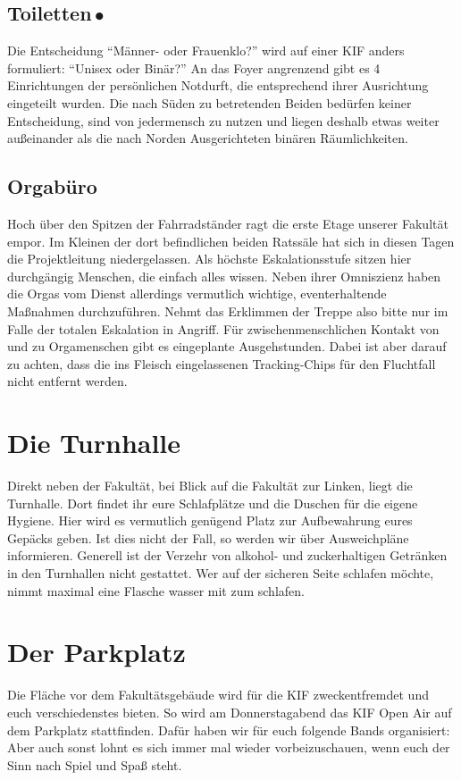 \subsection*{Toiletten{\,\color{StripeWC}$\bullet$\,}}
Die Entscheidung \enquote{Männer- oder Frauenklo?} wird auf einer KIF anders formuliert: \enquote{Unisex oder Binär?}
An das Foyer angrenzend gibt es 4 Einrichtungen der persönlichen Notdurft, die entsprechend ihrer Ausrichtung eingeteilt wurden.
Die nach Süden zu betretenden Beiden bedürfen keiner Entscheidung, sind von jedermensch zu nutzen und liegen deshalb etwas weiter außeinander als die nach Norden Ausgerichteten binären Räumlichkeiten.

\subsection*{Orgabüro}
Hoch über den Spitzen der Fahrradständer ragt die erste Etage unserer Fakultät empor.
Im Kleinen der dort befindlichen beiden Ratssäle hat sich in diesen Tagen die Projektleitung niedergelassen.
Als höchste Eskalationsstufe sitzen hier durchgängig Menschen, die einfach alles wissen.
Neben ihrer Omniszienz haben die Orgas vom Dienst allerdings vermutlich wichtige, eventerhaltende Maßnahmen durchzuführen.
Nehmt das Erklimmen der Treppe also bitte nur im Falle der totalen Eskalation in Angriff.
Für zwischenmenschlichen Kontakt von und zu Orgamenschen gibt es eingeplante Ausgehstunden.
Dabei ist aber darauf zu achten, dass die ins Fleisch eingelassenen Tracking-Chips für den Fluchtfall nicht entfernt werden.

\section*{Die Turnhalle}
Direkt neben der Fakultät, bei Blick auf die Fakultät zur Linken, liegt die Turnhalle.
Dort findet ihr eure Schlafplätze und die Duschen für die eigene Hygiene.
Hier wird es vermutlich genügend Platz zur Aufbewahrung eures Gepäcks geben.
Ist dies nicht der Fall, so werden wir über Ausweichpläne informieren.
Generell ist der Verzehr von alkohol- und zuckerhaltigen Getränken in den Turnhallen nicht gestattet.
Wer auf der sicheren Seite schlafen möchte, nimmt maximal eine Flasche wasser mit zum schlafen.

\section*{Der Parkplatz}
Die Fläche vor dem Fakultätsgebäude wird für die KIF zweckentfremdet und euch verschiedenstes bieten.  So wird am Donnerstagabend das KIF Open Air auf dem Parkplatz stattfinden. Dafür haben wir für euch folgende Bands organisiert:
Aber auch sonst lohnt es sich immer mal wieder vorbeizuschauen, wenn euch der Sinn nach Spiel und Spaß steht.

